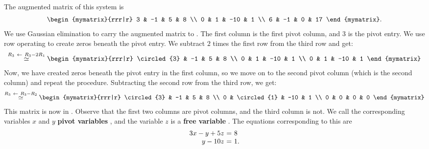 \begin{solution} The augmented matrix of this system is
  \begin{equation*}
    \begin{mymatrix}{rrr|r}
      3 &  -1  &  5 & 8 \\
      0 &   1 & -10 & 1 \\
      6 &  -1  &  0 & 17
    \end{mymatrix}.
  \end{equation*}
  We use Gaussian elimination to carry the augmented matrix to
  {\ef}. The first column is the first pivot column, and $3$ is the
  pivot entry. We use row operating to create zeros beneath the pivot
  entry. We subtract $2$ times the first row from the third row and get:
  \begin{equation*}
    \stackrel{R_3\rowop R_3-2R_1}{\roweq}
    \begin{mymatrix}{rrr|r}
      \circled{3} &  -1  &  5 & 8 \\
      0 &   1 & -10 & 1 \\
      0 &   1 & -10 & 1
    \end{mymatrix}
  \end{equation*}
  Now, we have created zeros beneath the pivot entry in the first
  column, so we move on to the second pivot column (which is the
  second column) and repeat the procedure. Subtracting the second row
  from the third row, we get:
  \begin{equation*}
    \stackrel{R_3\rowop R_3-R_2}{\roweq}
    \begin{mymatrix}{rrr|r}
      \circled{3} &  -1  &  5 & 8 \\
      0 &   \circled{1} & -10 & 1 \\
      0 &   0 & 0 & 0
    \end{mymatrix}
  \end{equation*}
  This matrix is now in {\ef}. Observe that the first two columns are
  pivot columns, and the third column is not. We call the
  corresponding variables $x$ and $y$ \textbf{pivot variables}%
  , and the variable $z$ is a \textbf{free
    variable}%
  .  The equations corresponding to this {\ef}
  are
  \begin{equation*}
    \begin{array}{r@{~}c@{~}l}
      3x - y + 5z &=& 8 \\
      y - 10z &=& 1.
    \end{array}
  \end{equation*}

\end{solution}
